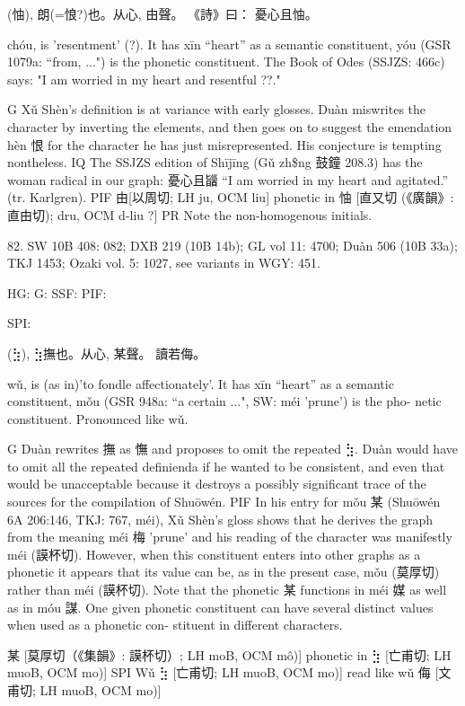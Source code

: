   (怞),
朗(=悢?)也。从心,
由聲。
《詩》曰： 憂心且怞。


chóu,
is 'resentment' (?).
It has xīn ``heart'' as a semantic constituent,
yóu (GSR 1079a: ``from, ...") is the phonetic constituent.
The Book of Odes (SSJZS: 466c) says:
"I am worried in my heart and resentful ??."

G    Xǔ Shèn's definition is at variance with early glosses.
    Duàn miswrites the character by inverting the elements, and then goes on to suggest the emendation hèn 恨 for the character he has just misrepresented. His conjecture is tempting nontheless.
IQ	The SSJZS edition of Shījīng (Gǔ zh\$ng 鼓鐘 208.3) has the woman radical in our graph: 憂心且䭬 ``I am worried in my heart and agitated.'' (tr. Karlgren).
PIF     由[以周切; LH ju, OCM liu] phonetic in 怞 [直又切 (《廣韻》: 直由切); dru, OCM d-liu ?]
PR   Note the non-homogenous initials.


82. SW 10B 408: 082; DXB 219 (10B 14b); GL vol 11: 4700; Duàn 506 (10B 33a); TKJ 1453; Ozaki vol. 5: 1027, see
variants in WGY: 451.


HG:
G: SSF: PIF:

SPI:

(⣳),
⣳撫也。从心,
某聲。
讀若侮。

wǔ,
is (as in)'to fondle affectionately'.
It has xīn ``heart'' as a semantic constituent,
mǒu (GSR 948a: ``a certain ...", SW: méi 'prune') is the pho- netic constituent.
Pronounced like wǔ.

G Duàn rewrites 撫 as 憮 and proposes to omit the repeated ⣳. Duàn would have to omit all the repeated definienda if he wanted to be consistent, and even that would be unacceptable because it destroys a possibly significant trace of the sources for the compilation of Shuōwén.
PIF In his entry for mǒu 某 (Shuōwén 6A 206:146, TKJ: 767, méi), Xǔ Shèn's gloss shows that he derives the graph from the meaning méi 梅 'prune' and his reading of the character was manifestly méi (謨杯切). However, when this constituent enters into other graphs as a phonetic it appears that its value can be, as in the present case, mǒu (莫厚切) rather than méi (謨杯切). Note that the phonetic 某 functions in méi 媒 as well as in móu 謀.
    One given phonetic constituent can have several distinct values when used as a phonetic con- stituent in different characters.



    某 [莫厚切（《集韻》: 謨杯切）; LH moB, OCM mô)] phonetic in ⣳ [亡甫切; LH muoB, OCM mo)]
SPI     Wǔ ⣳ [亡甫切; LH muoB, OCM mo)] read like wǔ 侮 [文甫切; LH muoB, OCM mo)]


